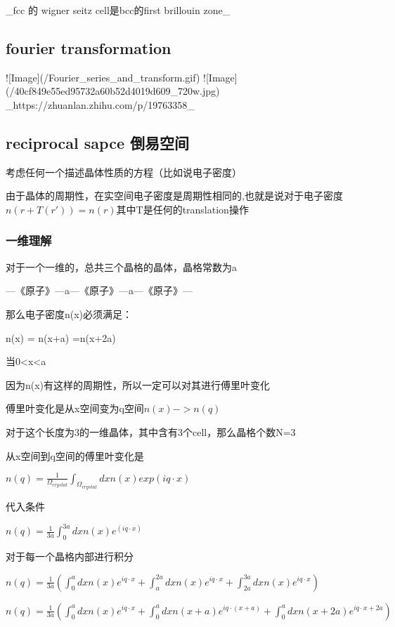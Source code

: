 \documentclass{article}
\begin{document}
_fcc 的 wigner seitz cell是bcc的first brillouin zone_



\subsection {fourier transformation}

![Image](/Fourier_series_and_transform.gif)
![Image](/40cf849e55ed95732a60b52d4019d609_720w.jpg)
_https://zhuanlan.zhihu.com/p/19763358_


\subsection {reciprocal sapce 倒易空间}

考虑任何一个描述晶体性质的方程（比如说电子密度）

由于晶体的周期性，在实空间电子密度是周期性相同的,也就是说对于电子密度$n(r+T(r'))=n(r)$其中T是任何的translation操作

\subsubsection{一维理解}

对于一个一维的，总共三个晶格的晶体，晶格常数为a

---《原子》---a---《原子》---a---《原子》---

那么电子密度n(x)必须满足：

    n(x)    =    n(x+a)       =n(x+2a)  
         
当0<x<a

因为n(x)有这样的周期性，所以一定可以对其进行傅里叶变化

傅里叶变化是从x空间变为q空间$n(x)->n(q)$

对于这个长度为3的一维晶体，其中含有3个cell，那么晶格个数N=3

从x空间到q空间的傅里叶变化是

$n(q)=\frac{1}{\Omega_{crystal}}\int_{\Omega_{crystal}} dxn(x)exp(iq·x)$

代入条件

$n(q)=\frac{1}{3a}\int_0^{3a} dxn(x)e^{(iq·x)}$

对于每一个晶格内部进行积分

$n(q)=\frac{1}{3a}(\int_0^adxn(x)e^{iq·x} +\int_a^{2a}dxn(x)e^{iq·x}+\int_{2a}^{3a}dxn(x)e^{iq·x})$

$n(q)=\frac{1}{3a}(\int_0^adxn(x)e^{iq·x} +\int_0^{a}dxn(x+a)e^{iq·(x+a)}+\int_{0}^{a}dxn(x+2a)e^{iq·x+2a})$
\end{document}
